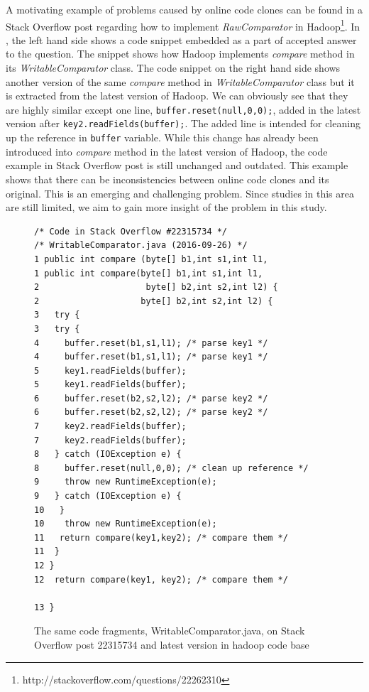 \documentclass{sig-alternate-05-2015}
\begin{document}
A motivating example of problems caused by online code clones can be found in a Stack Overflow post regarding how to implement \textit{RawComparator} in Hadoop\footnote{http://stackoverflow.com/questions/22262310}. In , the left hand side shows a code snippet embedded as a part of accepted answer to the question. The snippet shows how Hadoop implements \textit{compare} method in its \textit{WritableComparator} class. The code snippet on the right hand side shows another version of the same \textit{compare} method in \textit{WritableComparator} class but it is extracted from the latest version of Hadoop. We can obviously see that they are highly similar except one line, \verb|buffer.reset(null,0,0);|, added in the latest version after \verb|key2.readFields(buffer);|. The added line is intended for cleaning up the reference in \verb|buffer| variable. While this change has already been introduced into \textit{compare} method in the latest version of Hadoop, the code example in Stack Overflow post is still unchanged and outdated. This example shows that there can be inconsistencies between online code clones and its original.  %
This is an emerging and challenging problem. Since studies in this area are still limited, we aim to gain more insight of the problem in this study. %

\begin{figure}
\begin{lstlisting}
/* Code in Stack Overflow #22315734 */                      /* WritableComparator.java (2016-09-26) */
1 public int compare (byte[] b1,int s1,int l1,              1 public int compare(byte[] b1,int s1,int l1,
2                     byte[] b2,int s2,int l2) {            2                    byte[] b2,int s2,int l2) {
3   try {                                                   3   try {
4     buffer.reset(b1,s1,l1); /* parse key1 */              4     buffer.reset(b1,s1,l1); /* parse key1 */
5     key1.readFields(buffer);                              5     key1.readFields(buffer);
6     buffer.reset(b2,s2,l2); /* parse key2 */              6     buffer.reset(b2,s2,l2); /* parse key2 */
7     key2.readFields(buffer);                              7     key2.readFields(buffer);
8   } catch (IOException e) {                               8     buffer.reset(null,0,0); /* clean up reference */
9     throw new RuntimeException(e);                        9   } catch (IOException e) {
10   }                                                      10    throw new RuntimeException(e);
11   return compare(key1,key2); /* compare them */          11  }
12 }                                                        12  return compare(key1, key2); /* compare them */
                                                            13 }
\end{lstlisting}
\caption{The same code fragments, WritableComparator.java, on Stack Overflow post 22315734 and latest version in hadoop code base}
\label{fig:before-after}
\end{figure}
\end{document}
